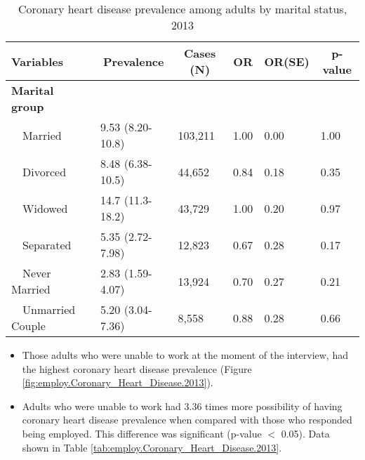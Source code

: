 \begin{table}[H]
\caption{Coronary heart disease prevalence  among adults by marital status, 2013\label{tab:marital.Coronary_Heart_Disease.2013}} 
\begin{center}
\begin{tabular}{llllll}
\hline\hline
\multicolumn{1}{l}{Variables}&\multicolumn{1}{c}{Prevalence}&\multicolumn{1}{c}{Cases (N)}&\multicolumn{1}{c}{OR}&\multicolumn{1}{c}{OR(SE)}&\multicolumn{1}{c}{p-value}\tabularnewline
\hline
{\bfseries Marital group}&&&&&\tabularnewline
~~Married&9.53 (8.20-10.8)&103,211&1.00&0.00&1.00\tabularnewline
~~Divorced&8.48 (6.38-10.5)& 44,652&0.84&0.18&0.35\tabularnewline
~~Widowed&14.7 (11.3-18.2)& 43,729&1.00&0.20&0.97\tabularnewline
~~Separated&5.35 (2.72-7.98)& 12,823&0.67&0.28&0.17\tabularnewline
~~Never Married&2.83 (1.59-4.07)& 13,924&0.70&0.27&0.21\tabularnewline
~~Unmarried Couple&5.20 (3.04-7.36)&  8,558&0.88&0.28&0.66\tabularnewline
\hline
\end{tabular}\end{center}

\end{table}

 
 \newpage
\begin{itemize}


\item Those adults who were 
unable to work at the moment of the interview, had the highest coronary heart disease prevalence (Figure \ref{fig:employ.Coronary_Heart_Disease.2013}).

\item Adults who were unable to work had 3.36 times more possibility of having coronary heart disease prevalence when compared with those who responded being employed. This difference was significant (p-value $<$ 0.05). 
Data shown in Table \ref{tab:employ.Coronary_Heart_Disease.2013}.


\end{itemize}

